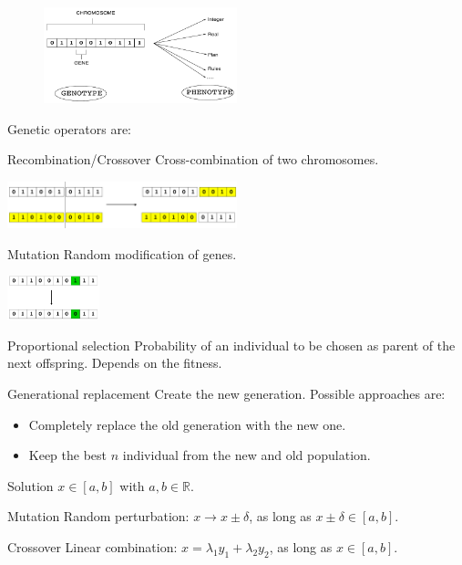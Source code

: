 \begin{figure}[ht]
    \centering
    \includegraphics[width=0.5\textwidth]{img/_genetic_terminology.pdf}
    \caption{}
\end{figure}


Genetic operators are:
\begin{descriptionlist}
    \item[Recombination/Crossover] 
        Cross-combination of two chromosomes.
        \begin{center}
            \includegraphics[width=0.5\textwidth]{img/_genetic_crossover.pdf}
        \end{center}
    \item[Mutation] 
        Random modification of genes.
        \begin{center}
            \includegraphics[width=0.2\textwidth]{img/_genetic_mutation.pdf}
        \end{center}
    \item[Proportional selection] 
        Probability of an individual to be chosen as parent of the next offspring. 
        Depends on the fitness.
    \item[Generational replacement] 
        Create the new generation. Possible approaches are:
        \begin{itemize}
            \item Completely replace the old generation with the new one.
            \item Keep the best $n$ individual from the new and old population.
        \end{itemize}
\end{descriptionlist}

\begin{example}
    Solution $x \in [a, b]$ with $a, b \in \mathbb{R}$.
    \begin{descriptionlist}
        \item[Mutation] Random perturbation: $x \rightarrow x \pm \delta$, as long as $x \pm \delta \in [a, b]$.
        \item[Crossover] Linear combination: $x = \lambda_1 y_1 + \lambda_2 y_2$, as long as $x \in [a, b]$.
    \end{descriptionlist}
\end{example}

